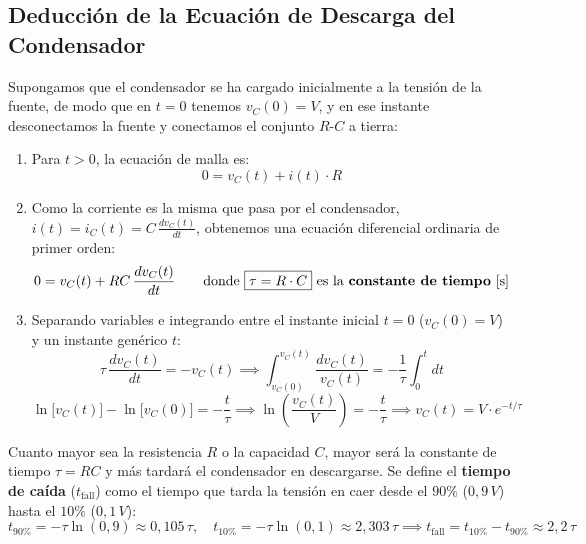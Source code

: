 \subsection{Deducción de la Ecuación de Descarga del Condensador}
Supongamos que el condensador se ha cargado inicialmente a la tensión de la fuente, de modo que en $t = 0$ tenemos $v_C(0) = V$, y en ese instante desconectamos la fuente y conectamos el conjunto $R$-$C$ a tierra:
\begin{enumerate}
    \item Para $t > 0$, la ecuación de malla es:
    \begin{equation}
        0 = v_C(t) + i(t)\cdot R
    \end{equation}
    \item Como la corriente es la misma que pasa por el condensador, $i(t) = i_C(t) = C\,\frac{dv_C(t)}{dt}$, obtenemos una ecuación diferencial ordinaria de primer orden:
    \begin{equation}
        0 = v_C(t) + R C\,\frac{dv_C(t)}{dt} \qquad \text{donde } \boxed{\tau = R\cdot C} \text{ es la \textbf{constante de tiempo} } [\si{\second}]
    \end{equation}
    \item Separando variables e integrando entre el instante inicial $t = 0$ ($v_C(0) = V$) y un instante genérico $t$:
    \begin{equation}
        \tau\,\frac{dv_C(t)}{dt} = -v_C(t) \implies \int_{v_C(0)}^{v_C(t)} \frac{dv_C(t)}{v_C(t)} = -\frac{1}{\tau}\int_0^t dt
    \end{equation}
    \begin{equation}
        \ln\big[v_C(t)\big] - \ln\big[v_C(0)\big] = -\frac{t}{\tau} \implies \ln\left(\frac{v_C(t)}{V}\right) = -\frac{t}{\tau} \implies \boxed{v_C(t) = V\cdot e^{-t/\tau}}
    \end{equation}
\end{enumerate}

Cuanto mayor sea la resistencia $R$ o la capacidad $C$, mayor será la constante de tiempo $\tau = RC$ y más tardará el condensador en descargarse. Se define el \textbf{tiempo de caída} ($t_{\text{fall}}$) como el tiempo que tarda la tensión en caer desde el $90\%$ ($0{,}9\,V$) hasta el $10\%$ ($0{,}1\,V$):
\begin{equation}
    t_{90\%} = -\tau\ln(0{,}9) \approx 0{,}105\,\tau, \quad t_{10\%} = -\tau\ln(0{,}1) \approx 2{,}303\,\tau \implies \boxed{t_{\text{fall}} = t_{10\%} - t_{90\%} \approx 2{,}2\,\tau}
\end{equation}

